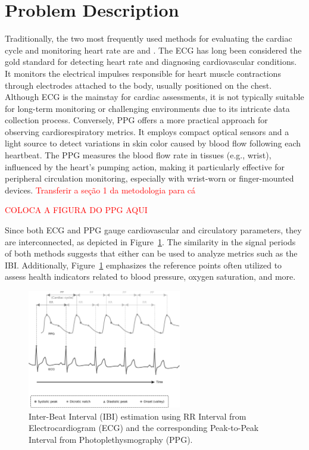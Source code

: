 \section{Problem Description}
\label{sec:problem}

Traditionally, the two most frequently used methods for evaluating the cardiac cycle and monitoring heart rate are  and . The \gls{ECG} has long been considered the gold standard for detecting heart rate and diagnosing cardiovascular conditions. It monitors the electrical impulses responsible for heart muscle contractions through electrodes attached to the body, usually positioned on the chest. Although \gls{ECG} is the mainstay for cardiac assessments, it is not typically suitable for long-term monitoring or challenging environments due to its intricate data collection process. Conversely, \gls{PPG} offers a more practical approach for observing cardiorespiratory metrics. It employs compact optical sensors and a light source to detect variations in skin color caused by blood flow following each heartbeat. The \gls{PPG} measures the blood flow rate in tissues (e.g., wrist), influenced by the heart's pumping action, making it particularly effective for peripheral circulation monitoring, especially with wrist-worn or finger-mounted devices. \textcolor{red}{Transferir a seção 1 da metodologia para cá}


\textcolor{red}{COLOCA A FIGURA DO PPG AQUI}


Since both \gls{ECG} and \gls{PPG} gauge cardiovascular and circulatory parameters, they are interconnected, as depicted in Figure~\ref{fig:ecg_and_ppg}. The similarity in the signal periods of both methods suggests that either can be used to analyze metrics such as the \gls{IBI}. Additionally, Figure~\ref{fig:ecg_and_ppg} emphasizes the reference points often utilized to assess health indicators related to blood pressure, oxygen saturation, and more.

\begin{figure}[t]
    \centering
    \includegraphics[width=0.6\textwidth]{img/ecg_ppg_signals.pdf}
    \caption{Inter-Beat Interval (IBI) estimation using RR Interval from Electrocardiogram (ECG) and the corresponding Peak-to-Peak Interval from Photoplethysmography (PPG).}
    \label{fig:ecg_and_ppg}
\end{figure}



